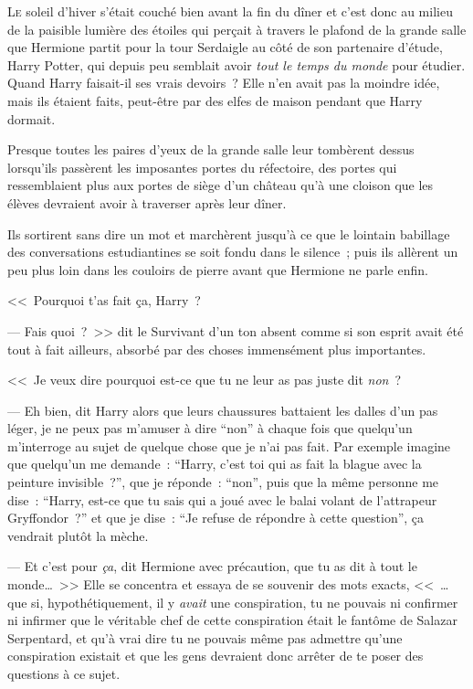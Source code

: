 
\lettrine{L}{e} soleil d'hiver s'était couché bien avant la fin du dîner et c'est donc au milieu de la paisible lumière des étoiles qui perçait à travers le plafond de la grande salle que Hermione partit pour la tour Serdaigle au côté de son partenaire d'étude, Harry Potter, qui depuis peu semblait avoir \emph{tout le temps du monde} pour étudier. Quand Harry faisait-il ses vrais devoirs~? Elle n'en avait pas la moindre idée, mais ils étaient faits, peut-être par des elfes de maison pendant que Harry dormait.

Presque toutes les paires d'yeux de la grande salle leur tombèrent dessus lorsqu'ils passèrent les imposantes portes du réfectoire, des portes qui ressemblaient plus aux portes de siège d'un château qu'à une cloison que les élèves devraient avoir à traverser après leur dîner.

Ils sortirent sans dire un mot et marchèrent jusqu'à ce que le lointain babillage des conversations estudiantines se soit fondu dans le silence~; puis ils allèrent un peu plus loin dans les couloirs de pierre avant que Hermione ne parle enfin.

<<~Pourquoi t'as fait ça, Harry~?

--- Fais quoi~?~>> dit le Survivant d'un ton absent comme si son esprit avait été tout à fait ailleurs, absorbé par des choses immensément plus importantes.

<<~Je veux dire pourquoi est-ce que tu ne leur as pas juste dit \emph{non}~?

--- Eh bien, dit Harry alors que leurs chaussures battaient les dalles d'un pas léger, je ne peux pas m'amuser à dire “non” à chaque fois que quelqu'un m'interroge au sujet de quelque chose que je n'ai pas fait. Par exemple imagine que quelqu'un me demande~: “Harry, c'est toi qui as fait la blague avec la peinture invisible~?”, que je réponde~: “non”, puis que la même personne me dise~: “Harry, est-ce que tu sais qui a joué avec le balai volant de l'attrapeur Gryffondor~?” et que je dise~: “Je refuse de répondre à cette question”, ça vendrait plutôt la mèche.

--- Et c'est pour \emph{ça}, dit Hermione avec précaution, que tu as dit à tout le monde…~>> Elle se concentra et essaya de se souvenir des mots exacts, <<~… que si, hypothétiquement, il y \emph{avait} une conspiration, tu ne pouvais ni confirmer ni infirmer que le véritable chef de cette conspiration était le fantôme de Salazar Serpentard, et qu'à vrai dire tu ne pouvais même pas admettre qu'une conspiration existait et que les gens devraient donc arrêter de te poser des questions à ce sujet.

